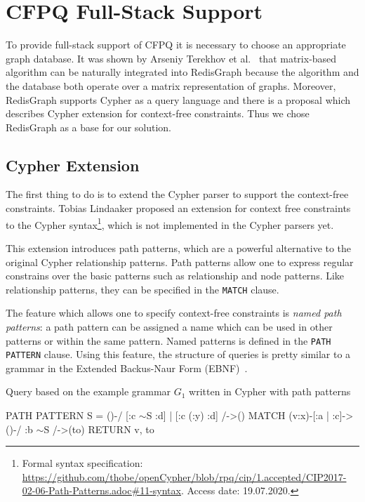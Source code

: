 \section{CFPQ Full-Stack Support}

To provide full-stack support of CFPQ it is necessary to choose an appropriate graph database.
It was shown by Arseniy Terekhov et al.~\cite{10.1145/3398682.3399163} that matrix-based algorithm can be naturally integrated into RedisGraph because the algorithm and the database both operate over a matrix representation of graphs.
Moreover, RedisGraph supports Cypher as a query language and there is a proposal which describes Cypher extension for context-free constraints.
Thus we chose RedisGraph as a base for our solution.


\subsection{Cypher Extension}
\label{subsec:cypher-extension}

The first thing to do is to extend the Cypher parser to support the context-free constraints.
Tobias Lindaaker proposed an extension  for context free constraints to the Cypher syntax\footnote{\label{cypher-proposal}Formal syntax specification: \url{https://github.com/thobe/openCypher/blob/rpq/cip/1.accepted/CIP2017-02-06-Path-Patterns.adoc\#11-syntax}. Access date: 19.07.2020.}, which is not implemented in the Cypher parsers yet.

This extension introduces path patterns, which are a powerful alternative to the original Cypher relationship patterns.
Path patterns allow one to express regular constrains over the basic patterns such as relationship and node patterns.
Like relationship patterns, they can be specified in the \texttt{MATCH} clause.

The feature which allows one to specify context-free constraints is \textit{named path patterns}: a path pattern can be assigned a name which can be used in other patterns or within the same pattern.
Named patterns is defined in the \texttt{PATH PATTERN} clause.
Using this feature, the structure of queries is pretty similar to a grammar in the Extended Backus-Naur Form (EBNF)~\cite{EBNF_ISO}.

\begin{algorithm}[t]
\begin{algorithmic}[1]
\caption{Query based on the example grammar $G_1$ written in Cypher with path patterns}
\label{lst:cypher_example}
\State PATH PATTERN S = ()-/ [:c $\sim$S :d] | [:c (:y) :d] /->()
\State MATCH (v:x)-[:a | :c]->()-/ :b $\sim$S /->(to)
\State RETURN v, to
\end{algorithmic}
\end{algorithm}


